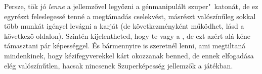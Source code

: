 Persze, tök jó \emph{lenne} a  jellemzővel legyőzni a génmanipulált szuper"~katonát, de ez egyrészt feleslegessé tenné a megtámadás cselekvést, másrészt valószínűleg sokkal több munkát igényel levágni a karját (de következményként működhet, lásd a következő oldalon). Szintén kijelentheted, hogy te vagy a , de ezt azért alá kéne támasztani pár képességgel. És bármennyire is szeretnél  lenni, ami megtiltaná mindenkinek, hogy kézifegyverekkel kárt okozzanak benned, de ennek elfogadása elég valószínűtlen, hacsak nincsenek Szuperképesség jellemzők a játékban.

